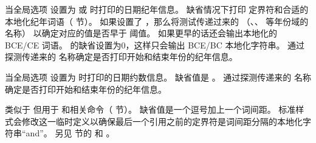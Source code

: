 \begin{ltxsyntax}
当全局选项  设置为  或  时打印的日期纪年信息。
缺省情况下打印  定界符和合适的本地化纪年词语（ 节）。
如果设置了 ，那么将测试传递过来的 
（、、 等年份域的名称）
以确定对应的值是否早于  阈值。
如果更早的话还会输出本地化的 BCE/CE 词语。
 的缺省设置为0，这样只会输出 BCE/BC 本地化字符串。
通过探测传递来的  名称确定是否打印开始和结束年份的纪年信息。

当全局选项  设置为  时打印的日期约数信息。
缺省值是 。
通过探测传递来的  名称确定是否打印开始和结束年份的纪年信息。

类似于  但用于  和相关命令（ 节）。
缺省值是一个逗号加上一个词间距。
标准样式会修改这一临时定义以确保最后一个引用之前的定界符是词间距分隔的本地化字符串“and”。
另见  节的  和 。


\end{ltxsyntax}
